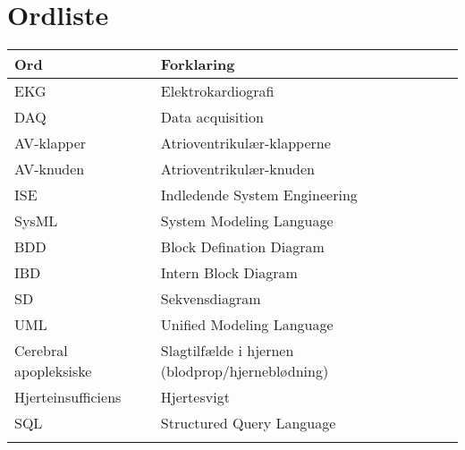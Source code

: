 \chapter{Ordliste}

\begin{longtabu} to 
    Ord &    Forklaring\\
    \toprule 
	EKG	&	Elektrokardiografi\\
	DAQ	&	Data acquisition\\
	AV-klapper	&	Atrioventrikulær-klapperne\\
	AV-knuden	&	Atrioventrikulær-knuden\\
	ISE & Indledende System Engineering \\
	SysML & System Modeling Language \\
	BDD & Block Defination Diagram \\
	IBD & Intern Block Diagram\\
	SD & Sekvensdiagram\\
	UML & Unified Modeling Language\\
	Cerebral apopleksiske &	Slagtilfælde i hjernen (blodprop/hjerneblødning)\\
	Hjerteinsufficiens	&	Hjertesvigt\\
	SQL & Structured Query Language\\
\label{forkort}
\end{longtabu}